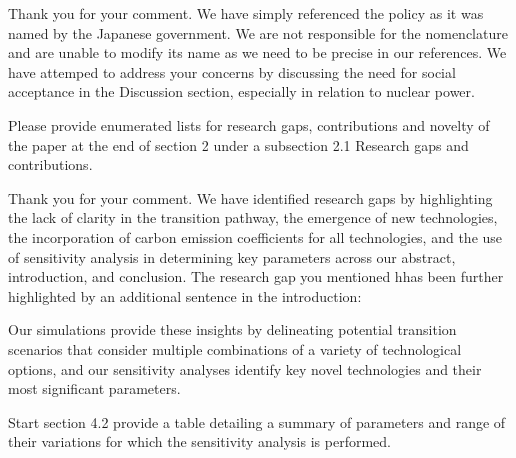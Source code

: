 \documentclass[answers,11pt]{exam}
\begin{document}
\begin{questions}
        \begin{solution}
        
                 Thank you for your comment. We have simply referenced the policy as it was named by the Japanese government. We are not responsible for the nomenclature and are unable to modify its name as we need to be precise in our references. We have attemped to address your concerns by discussing the need for social acceptance in the Discussion section, especially in relation to nuclear power.
                 
                 
        \end{solution}      
        
        
                        \question   Please provide enumerated lists for research gaps, contributions and novelty of the paper at the end of section 2 under a subsection 2.1 Research gaps and contributions.
                                
        \begin{solution}
        
                 Thank you for your comment. We have identified research gaps by highlighting the lack of clarity in the transition pathway, the emergence of new technologies, the incorporation of carbon emission coefficients for all technologies, and the use of sensitivity analysis in determining key parameters across our abstract, introduction, and conclusion. The research gap you mentioned hhas been further highlighted by an additional sentence in the introduction:
                 
                 Our simulations provide these insights by delineating potential transition scenarios that consider multiple combinations of a variety of technological options, and our sensitivity analyses identify key novel technologies and their most significant parameters.
                 
                 
        \end{solution}     
        
                        \question   Start section 4.2 provide a table detailing a summary of parameters and range of their variations for which the sensitivity analysis is performed.
                                
        \begin{solution}
        

\end{solution}
\end{questions}
\end{document}
